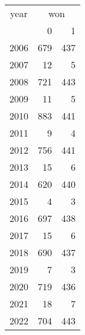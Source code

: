 \footnotesize\begin{tabular}[t]{lrr}
\toprule
\multicolumn{1}{c}{year} & \multicolumn{2}{c}{won} \\
\cmidrule(l{3pt}r{3pt}){1-1} \cmidrule(l{3pt}r{3pt}){2-3}
  & 0 & 1\\
\midrule
2006 & 679 & 437\\
2007 & 12 & 5\\
2008 & 721 & 443\\
2009 & 11 & 5\\
2010 & 883 & 441\\
2011 & 9 & 4\\
2012 & 756 & 441\\
2013 & 15 & 6\\
2014 & 620 & 440\\
2015 & 4 & 3\\
2016 & 697 & 438\\
2017 & 15 & 6\\
2018 & 690 & 437\\
2019 & 7 & 3\\
2020 & 719 & 436\\
2021 & 18 & 7\\
2022 & 704 & 443\\
\bottomrule
\end{tabular}
